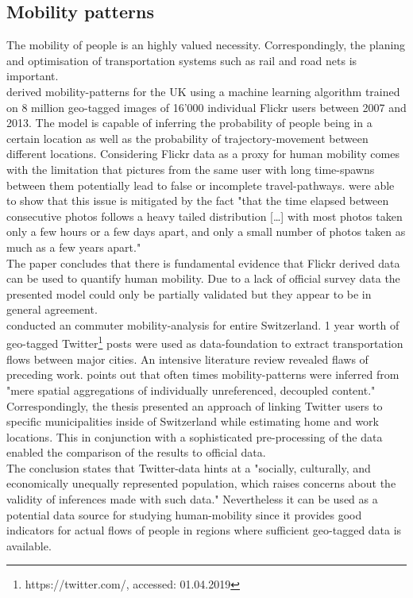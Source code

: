 \subsection{Mobility patterns}
The mobility of people is an highly valued necessity. Correspondingly, the planing and optimisation of transportation systems such as rail and road nets is important. \\

\textcite{Barchiesi2015} derived mobility-patterns for the UK using a machine learning algorithm trained on 8 million geo-tagged images of 16'000 individual Flickr users between 2007 and 2013. The model is capable of inferring the probability of people being in a certain location as well as the probability of trajectory-movement between different locations. Considering Flickr data as a proxy for human mobility comes with the limitation that pictures from the same user with long time-spawns between them potentially lead to false or incomplete travel-pathways. \textcite[p.7]{Barchiesi2015} were able to show that this issue is mitigated by the fact "that the time elapsed between consecutive photos follows a heavy tailed distribution [\dots] with most photos taken only a few hours or a few days apart, and only a small number of photos taken as much as a few years apart." \\
The paper concludes that there is fundamental evidence that Flickr derived data can be used to quantify human mobility. Due to a lack of official survey data the presented model could only be partially validated but they appear to be in general agreement. \\

\textcite{Grossenbacher2014} conducted an commuter mobility-analysis for entire Switzerland. 1 year worth of geo-tagged Twitter\footnote{https://twitter.com/, accessed: 01.04.2019} posts were used as data-foundation to extract transportation flows between major cities. An intensive literature review revealed flaws of preceding work. \citeauthor[p.5]{Grossenbacher2014} points out that often times mobility-patterns were inferred from "mere spatial aggregations of individually unreferenced, decoupled content." Correspondingly, the thesis presented an approach of linking Twitter users to specific municipalities inside of Switzerland while estimating home and work locations. This in conjunction with a sophisticated pre-processing of the data enabled the comparison of the results to official data.\\
The conclusion states that Twitter-data hints at a "socially, culturally, and economically unequally represented population, which raises concerns about the validity of inferences made with such data." \parencite[p.4]{Grossenbacher2014} Nevertheless it can be used as a potential data source for studying human-mobility since it provides good indicators for actual flows of people in regions where sufficient geo-tagged data is available.


